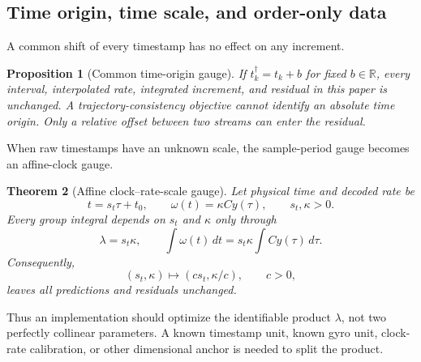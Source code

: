 \documentclass[11pt]{article}
\newtheorem{theorem}{Theorem}
\newtheorem{proposition}[theorem]{Proposition}
\newcommand{\R}{\mathbb{R}}
\begin{document}
    \subsection{Time origin, time scale, and order-only data}

    A common shift of every timestamp has no effect on any increment.
    \begin{proposition}[Common time-origin gauge]
If $t_k^\dagger=t_k+b$ for fixed $b\in\R$, every interval, interpolated rate, integrated
increment, and residual in this paper is unchanged. A trajectory-consistency objective
cannot identify an absolute time origin. Only a \emph{relative} offset between two
streams can enter the residual.
    \end{proposition}

    When raw timestamps have an unknown scale, the sample-period gauge becomes an
    affine-clock gauge.
    \begin{theorem}[Affine clock--rate-scale gauge]
Let physical time and decoded rate be
\begin{equation}
    t=s_t\tau+t_0,
    \qquad
    \omega(t)=\kappa C y(\tau),
    \qquad s_t,\kappa>0.
\end{equation}
Every group integral depends on $s_t$ and $\kappa$ only through
\begin{equation}
    \lambda=s_t\kappa,
    \qquad
    \int \omega(t)\,dt
    =s_t\kappa\int C y(\tau)\,d\tau.
    \label{eq:affine-time-rate-product}
\end{equation}
Consequently,
\begin{equation}
    (s_t,\kappa)\longmapsto(cs_t,\kappa/c),
    \qquad c>0,
\end{equation}
leaves all predictions and residuals unchanged.
    \end{theorem}

    Thus an implementation should optimize the identifiable product $\lambda$, not two
    perfectly collinear parameters. A known timestamp unit, known gyro unit, clock-rate
    calibration, or other dimensional anchor is needed to split the product.
\end{document}
